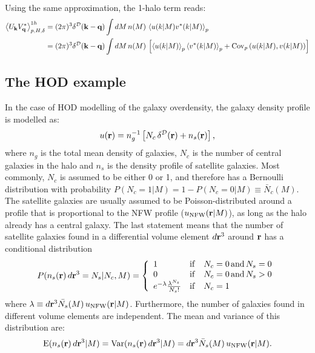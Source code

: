 \documentclass{article}
\begin{document}
  Using the same approximation, the 1-halo term reads:
  \begin{align}
    \left\langle U_{\bf k}V^*_{\bf q}\right\rangle_{p,H,\delta}^{1h}&=(2\pi)^3\delta^{\cal D}({\bf k}-{\bf q})\int dM\,n(M)\,\left\langle u(k|M) v^*(k|M)\right\rangle_p\\
    &=(2\pi)^3\delta^{\cal D}({\bf k}-{\bf q})\int dM\,n(M)\,\left[\left\langle u(k|M)\right\rangle_p\left\langle v^*(k|M)\right\rangle_p+{\rm Cov}_p\left(u(k|M),v(k|M)\right)\right]
  \end{align}

  \subsection{The HOD example}
    In the case of HOD modelling of the galaxy overdensity, the galaxy density profile is modelled as:
    \begin{equation}
      u({\bf r})=n_g^{-1}\left[N_c\,\delta^{\cal D}({\bf r})+n_s({\bf r})\right],
    \end{equation}
    where $n_g$ is the total mean density of galaxies, $N_c$ is the number of central galaxies in the halo and $n_s$ is the density profile of satellite galaxies. Most commonly, $N_c$ is assumed to be either 0 or 1, and therefore has a Bernoulli distribution with probability $P(N_c=1|M)=1-P(N_c=0|M)\equiv \bar{N}_c(M)$. The satellite galaxies are usually assumed to be Poisson-distributed around a profile that is proportional to the NFW profile ($u_{\rm NFW}({\bf r}|M)$), as long as the halo already has a central galaxy. The last statement means that the number of satellite galaxies found in a differential volume element $d{\bf r}^3$ around ${\bf r}$ has a conditional distribution
    \begin{equation}
      P(n_s({\bf r})\,d{\bf r}^3=N_s|N_c,M)=
      \left\{\begin{array}{lll}
          1 & {\rm if} & N_c=0\,{\rm and}\,N_s=0\\
          0 & {\rm if} & N_c=0\,{\rm and}\,N_s>0\\
          e^{-\lambda}\frac{\lambda^{N_s}}{N_s!} & {\rm if} & N_c=1
      \end{array}\right.
    \end{equation}
    where $\lambda\equiv d{\bf r}^3\bar{N_s}(M)\,u_{\rm NFW}({\bf r}|M)$. Furthermore, the number of galaxies found in different volume elements are independent. The mean and variance of this distribution are:
    \begin{equation}
      {\rm E}(n_s({\bf r})\,d{\bf r}^3|M)={\rm Var}(n_s({\bf r})\,d{\bf r}^3|M)=d{\bf r}^3 \bar{N}_s(M)\,u_{\rm NFW}({\bf r}|M).
    \end{equation}
\end{document}
